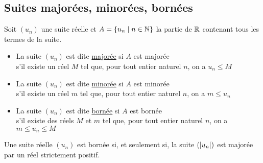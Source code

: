 \subsection{Suites majorées, minorées, bornées}
\begin{defprop}
    Soit \((u_n)\) une suite réelle et \(A = \left\lbrace u_n \;\middle|\; n \in \mathbb{N}\right\rbrace\) la partie de \(\mathbb{R}\) contenant tous les termes de la suite. 
    \begin{itemize}
        \item La suite \((u_n)\) est dite \underline{majorée} si \(A\) est majorée\\
        \cad s'il existe un réel \(M\) tel que, pour tout entier naturel \(n\), on a \(u_n \leq M\)
        \item La suite \((u_n)\) est dite \underline{minorée} si \(A\) est minorée\\
        \cad s'il existe un réel \(m\) tel que, pour tout entier naturel \(n\), on a \(m \leq u_n\)
        \item La suite \((u_n)\) est dite \underline{bornée} si \(A\) est bornée\\
        \cad s'il existe des réels \(M\) et \(m\) tel que, pour tout entier naturel \(n\), on a \(m \leq u_n \leq M\)
    \end{itemize}
\end{defprop}
\begin{defprop}
    Une suite réelle \((u_n)\) est bornée si, et seulement si, la suite \((\left\lvert u_n\right\rvert)\) est majorée par un réel strictement positif.
\end{defprop}

